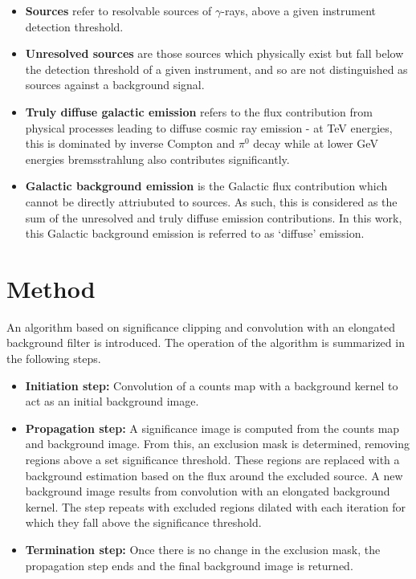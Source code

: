\documentclass{PoS}
\begin{document}
\begin{itemize}[noitemsep,nolistsep]
\item \textbf{Sources} refer to resolvable sources of $\gamma$-rays, above a given instrument detection threshold.
\item \textbf{Unresolved sources} are those sources which physically exist but fall below the detection threshold of a given instrument, and so are not distinguished as sources against a background signal.
\item \textbf{Truly diffuse galactic emission} refers to the flux contribution from physical processes leading to diffuse cosmic ray emission - at TeV energies, this is dominated by inverse Compton and $\pi^0$ decay while at lower GeV energies bremsstrahlung also contributes significantly.
\item \textbf{Galactic background emission} is the Galactic flux contribution which cannot be directly attriubuted to sources. As such, this is considered as the sum of the unresolved and truly diffuse emission contributions. In this work, this Galactic background emission is referred to as `diffuse' emission.
\end{itemize}

\section{Method}

An algorithm based on significance clipping and convolution with an elongated background filter is introduced. The operation of the algorithm is summarized in the following steps.

\begin{itemize}[noitemsep,nolistsep]
\item \textbf{Initiation step:} Convolution of a counts map with a background kernel to act as an initial background image.
\item \textbf{Propagation step:} A significance image is computed from the counts map and background image. From this, an exclusion mask is determined, removing regions above a set significance threshold. These regions are replaced with a background estimation based on the flux around the excluded source. A new background image results from convolution with an elongated background kernel. The step repeats with excluded regions dilated with each iteration for which they fall above the significance threshold.
\item \textbf{Termination step:} Once there is no change in the exclusion mask, the propagation step ends and the final background image is returned.
\end{itemize}
\end{document}
